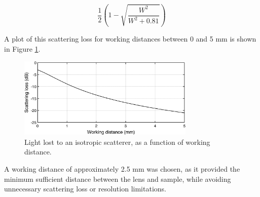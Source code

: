 \begin{equation}
\frac{1}{2} \left( 1 - \sqrt{\frac{W^2}{W^2 + 0.81}} \right)
\end{equation}

A plot of this scattering loss for working distances between 0 and 5 mm is shown in Figure \ref{fig:wd}.

\begin{figure}[h!]
\centering
\includegraphics[width=0.75\textwidth]{Images/System/grin_scattering2.png}
\caption[Light lost to an isotropic scatterer, as a function of working distance.]{Light lost to an isotropic scatterer, as a function of working distance. \label{fig:wd}}
\end{figure}

A working distance of approximately 2.5 mm was chosen, as it provided the minimum sufficient distance between the lens and sample, while avoiding unnecessary scattering loss or resolution limitations.





